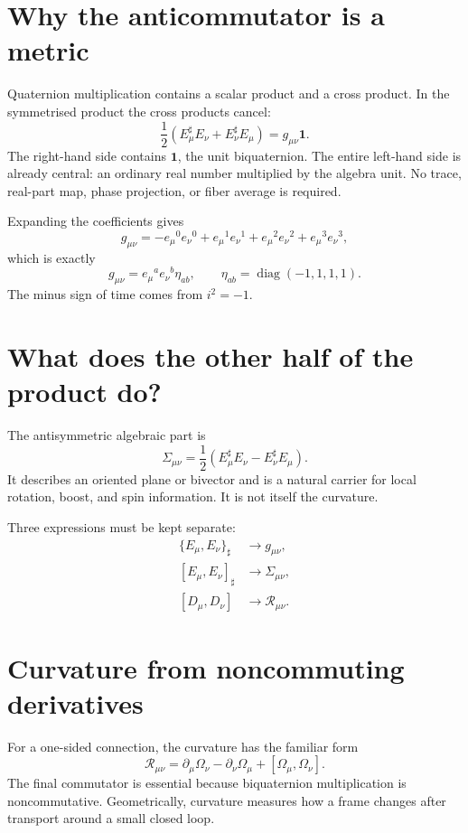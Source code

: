 \section{Why the anticommutator is a metric}
Quaternion multiplication contains a scalar product and a cross product.  In
the symmetrised product the cross products cancel:
\[
 \boxed{
 \frac12\left(E_\mu^\sharp E_\nu+E_\nu^\sharp E_\mu\right)
 =g_{\mu\nu}\mathbf1.}
\]
The right-hand side contains $\mathbf1$, the unit biquaternion.  The entire
left-hand side is already central: an ordinary real number multiplied by the
algebra unit.  No trace, real-part map, phase projection, or fiber average is
required.

Expanding the coefficients gives
\[
 g_{\mu\nu}
 =-e_\mu{}^0e_\nu{}^0+
  e_\mu{}^1e_\nu{}^1+
  e_\mu{}^2e_\nu{}^2+
  e_\mu{}^3e_\nu{}^3,
\]
which is exactly
\[
 g_{\mu\nu}=e_\mu{}^a e_\nu{}^b\eta_{ab},
 \qquad \eta_{ab}=\operatorname{diag}(-1,1,1,1).
\]
The minus sign of time comes from $i^2=-1$.

\section{What does the other half of the product do?}
The antisymmetric algebraic part is
\[
 \Sigma_{\mu\nu}
 =\frac12\left(E_\mu^\sharp E_\nu-E_\nu^\sharp E_\mu\right).
\]
It describes an oriented plane or bivector and is a natural carrier for local
rotation, boost, and spin information.  It is not itself the curvature.

Three expressions must be kept separate:
\begin{align*}
 \{E_\mu,E_\nu\}_\sharp
 &\longrightarrow g_{\mu\nu},\\
 [E_\mu,E_\nu]_\sharp
 &\longrightarrow \Sigma_{\mu\nu},\\
 [D_\mu,D_\nu]
 &\longrightarrow \mathcal R_{\mu\nu}.
\end{align*}

\section{Curvature from noncommuting derivatives}
For a one-sided connection, the curvature has the familiar form
\[
 \mathcal R_{\mu\nu}
 =\partial_\mu\Omega_\nu-\partial_\nu\Omega_\mu
  +[\Omega_\mu,\Omega_\nu].
\]
The final commutator is essential because biquaternion multiplication is
noncommutative.  Geometrically, curvature measures how a frame changes after
transport around a small closed loop.

